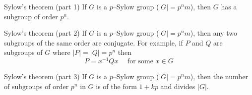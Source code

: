 \documentclass[avery5371,grid]{flashcards}
\begin{document}
\begin{flashcard}[Theorem]{Sylow's theorem (part 1)}
If $G$ is a $p$--Sylow group ($|G| = p^{n}m$),
then $G$ has a subgroup of order $p^{n}$.
\end{flashcard}

\begin{flashcard}[Theorem]{Sylow's theorem (part 2)}
If $G$ is a $p$--Sylow group ($|G| = p^{n}m$), then any 
two subgroups of the same order are conjugate.  For example,
if $P$ and $Q$ are subgroups of $G$ where $|P|=|Q|=p^{n}$ then
\begin{equation*}
P = x^{-1}Qx \quad \text{ for some } x \in G
\end{equation*}
\end{flashcard}

\begin{flashcard}[Theorem]{Sylow's theorem (part 3)}
If $G$ is a $p$--Sylow group ($|G| = p^{n}m$),
then the number of subgroups of order $p^{n}$ in $G$ is
of the form $1 + kp$ and divides $|G|$.
\end{flashcard}
\end{document}
